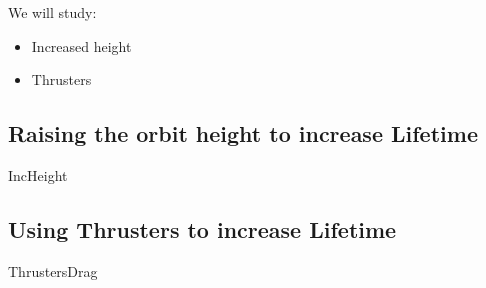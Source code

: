 We will study:

\begin{itemize}
\item Increased height
\item Thrusters
\end{itemize}

\subsection{Raising the orbit height to increase Lifetime}
{IncHeight}

\subsection{Using Thrusters to increase Lifetime}
{ThrustersDrag}
